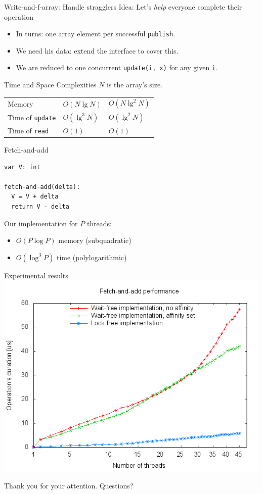 \documentclass{beamer}
\begin{document}
\begin{frame}[fragile]{Write-and-f-array: Handle stragglers}
Idea: Let's \emph{help} everyone complete their operation
\begin{itemize}
\item In turns: one array element per successful \verb+publish+.
\item We need his data: extend the interface to cover this.
\item We are reduced to one concurrent \verb+update(i, x)+ for any
given \verb+i+.
\end{itemize}
\end{frame}

\begin{frame}{Time and Space Complexities}
$N$ is the array's size.

\begin{tabular}{|l||l|l|}
\hline
Memory & $O(N \lg N)$ & $O(N \lg^2 N)$\\
Time of \verb+update+ & $O(\lg^3 N)$ & $O(\lg^2 N)$\\
Time of \verb+read+ & $O(1)$ & $O(1)$ \\
\hline
\end{tabular}
\end{frame}

\begin{frame}[fragile]{Fetch-and-add}
\begin{Verbatim}
var V: int

fetch-and-add(delta):
  V = V + delta
  return V - delta
\end{Verbatim}

Our implementation for $P$ threads:
\begin{itemize}
\item $O(P \log P)$ memory (subquadratic)
\item $O(\log^3 P)$ time (polylogarithmic)
\end{itemize}
\end{frame}

\begin{frame}{Experimental results}
\includegraphics[scale=0.6]{meas.png}
\end{frame}

\begin{frame}{}
Thank you for your attention. Questions?
\end{frame}
\end{document}
